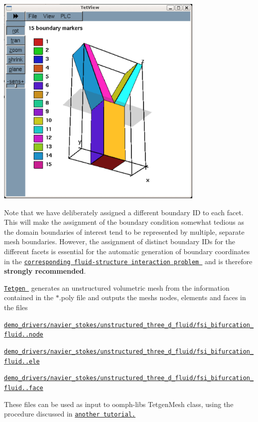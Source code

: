  
\begin{DoxyImage}
\includegraphics[width=0.75\textwidth]{tetgen_boundaries}
\end{DoxyImage}


Note that we have deliberately assigned a different boundary ID to each facet. This will make the assignment of the boundary condition somewhat tedious as the domain boundaries of interest tend to be represented by multiple, separate mesh boundaries. However, the assignment of distinct boundary I\+Ds for the different facets is essential for the automatic generation of boundary coordinates in the \href{../../../interaction/unstructured_three_d_fsi/html/index.html}{\tt corresponding fluid-\/structure interaction problem } and is therefore {\bfseries strongly recommended}.

\href{http://wias-berlin.de/software/tetgen//}{\tt {\ttfamily Tetgen} } generates an unstructured volumetric mesh from the information contained in the {\ttfamily $\ast$.poly} file and outputs the mesh\textquotesingle{}s nodes, elements and faces in the files
\begin{DoxyItemize}
\item \href{../../../../demo_drivers/navier_stokes/unstructured_three_d_fluid/fsi_bifurcation_fluid.1.node}{\tt demo\+\_\+drivers/navier\+\_\+stokes/unstructured\+\_\+three\+\_\+d\+\_\+fluid/fsi\+\_\+bifurcation\+\_\+fluid..\+node}
\item \href{../../../../demo_drivers/navier_stokes/unstructured_three_d_fluid/fsi_bifurcation_fluid.1.ele}{\tt demo\+\_\+drivers/navier\+\_\+stokes/unstructured\+\_\+three\+\_\+d\+\_\+fluid/fsi\+\_\+bifurcation\+\_\+fluid..\+ele}
\item \href{../../../../demo_drivers/navier_stokes/unstructured_three_d_fluid/fsi_bifurcation_fluid.1.face}{\tt demo\+\_\+drivers/navier\+\_\+stokes/unstructured\+\_\+three\+\_\+d\+\_\+fluid/fsi\+\_\+bifurcation\+\_\+fluid..\+face}
\end{DoxyItemize}These files can be used as input to {\ttfamily oomph-\/lib\textquotesingle{}s} {\ttfamily Tetgen\+Mesh} class, using the procedure discussed in \href{../../../meshes/mesh_from_tetgen/html/index.html}{\tt another tutorial.}

